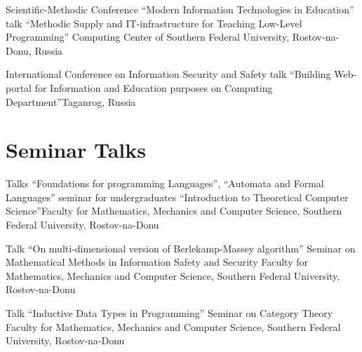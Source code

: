 \documentclass[11pt,a4paper]{moderncv}   %
\begin{document}
%
    {Scientific-Methodic Conference “Modern Information Technologies in Education”}%
    {talk “Methodic Supply and IT-infrastructure for Teaching Low-Level Programming”}%
    {Computing Center of Southern Federal University, Rostov-na-Donu, Russia}{}%
    {}

%
    {International Conference on Information Security and Safety}%
    {talk “Building Web-portal for Information and Education purposes on Computing Department”}{Taganrog, Russia}{}%
    {}


\section{Seminar Talks}





%
    {Talks “Foundations for programming Languages”, “Automata and Formal Languages”}%
    {seminar for undergraduates “Introduction to Theoretical Computer Science”}{Faculty for Mathematics, Mechanics and Computer Science, Southern Federal University, Rostov-na-Donu}{}%
    {}

%
    {}

%
    {Talk “On multi-dimensional version of Berlekamp-Massey algorithm”}%
    {Seminar on Mathematical Methods in Information Safety and Security}%
    {Faculty for Mathematics, Mechanics and Computer Science, Southern Federal University, Rostov-na-Donu}%
    {}%
    {}

%
    {Talk “Inductive Data Types in Programming”}%
    {Seminar on Category Theory}%
    {Faculty for Mathematics, Mechanics and Computer Science, Southern Federal University, Rostov-na-Donu}%
    {}%
    {}
\end{document}
